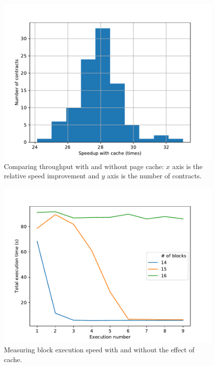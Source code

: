 
\begin{figure}[tb]
  \includegraphics[width=\columnwidth]{3-vm-security/figures/cache-speed.pdf}
  \caption{Comparing throughput with and without page cache: $x$ axis is the relative speed improvement and $y$ axis is the number of contracts.}
  \label{fig:cache-measurement}
\end{figure}

\begin{figure}[tb]
  \includegraphics[width=\columnwidth]{3-vm-security/figures/cache-persistence.pdf}
  \caption{Measuring block execution speed with and without the effect of cache.}
  \label{fig:cache-persistence}
\end{figure}


